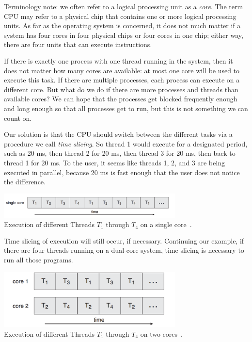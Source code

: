 Terminology note: we often refer to a logical processing unit as a \textit{core}. The term CPU may refer to a physical chip that contains one or more logical processing units. As far as the operating system is concerned, it does not much matter if a system has four cores in four physical chips or four cores in one chip; either way, there are four units that can execute instructions.

If there is exactly one process with one thread running in the system, then it does not matter how many cores are available: at most one core will be used to execute this task. If there are multiple processes, each process can execute on a different core. But what do we do if there are more processes and threads than available cores? We can hope that the processes get blocked frequently enough and long enough so that all processes get to run, but this is not something we can count on.

Our solution is that the CPU should switch between the different tasks via a procedure we call \textit{time slicing}. So thread 1 would execute for a designated period, such as 20 ms, then thread 2 for 20 ms, then thread 3 for 20 ms, then back to thread 1 for 20 ms. To the user, it seems like threads 1, 2, and 3 are being executed in parallel, because 20 ms is fast enough that the user does not notice the difference.

\begin{center}
	\includegraphics[width=0.7\textwidth]{images/single-core-execution.png}\\
	Execution of different Threads $T_{1}$ through $T_{4}$ on a single core~\cite{osc}.
\end{center}

Time slicing of execution will still occur, if necessary. Continuing our example, if there are four threads running on a dual-core system, time slicing is necessary to run all those programs.

\begin{center}
	\includegraphics[width=0.7\textwidth]{images/dual-core-execution.png}\\
	Execution of different Threads $T_{1}$ through $T_{4}$ on two cores~\cite{osc}.
\end{center}

